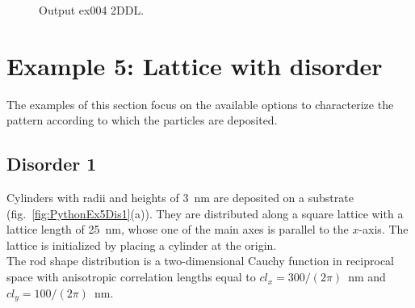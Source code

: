 \begin{figure}[H]
\hfill
{}
\hfill
{}
\hfill
\caption{Output ex004 2DDL.}
\end{figure}

\newpage
\section{Example 5: Lattice with disorder}
The examples of this section focus on the available options to characterize the pattern according to which the particles are deposited.


\subsection{Disorder 1} \label{sec:ex005Dis1}
Cylinders with radii and heights of 3~nm are deposited on a substrate (fig.~\ref{fig:PythonEx5Dis1}(a)). They are distributed along a square lattice with a lattice length of 25~nm, whose one of the main axes is parallel to the $x$-axis. The lattice is initialized by placing a cylinder at the origin.\\ The rod shape distribution is a two-dimensional Cauchy function in reciprocal space with anisotropic correlation lengths equal to $cl_x=300/(2\pi)$~nm and $cl_y=100/(2\pi)$~nm.


